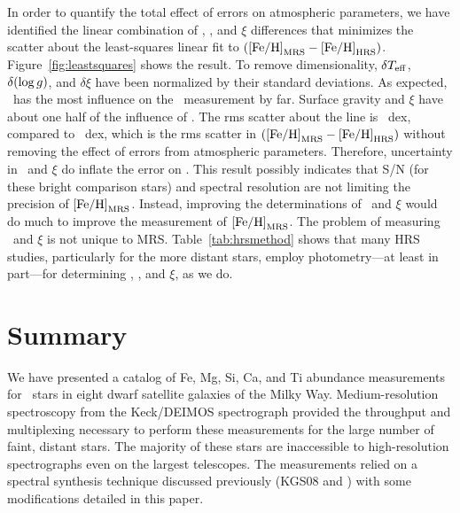 \documentclass{emulateapj}
\begin{document}
In order to quantify the total effect of errors on atmospheric
parameters, we have identified the linear combination of \teff, \logg,
and $\xi$ differences that minimizes the scatter about the
least-squares linear fit to $({\rm [Fe/H]}_{\rm MRS} - {\rm [Fe/H]}_{\rm
  HRS})$.  Figure~\ref{fig:leastsquares} shows the result.  To remove
dimensionality, $\delta T_{\rm eff}$, $\delta(\log g)$, and
$\delta\xi$ have been normalized by their standard deviations.  As
expected, \teff\ has the most influence on the \feh\ measurement by
far.  Surface gravity and $\xi$ have about one half of the influence
of \teff.  The rms scatter about the line is \fehscatter~dex, compared
to \allfehdiffsigma~dex, which is the rms scatter in $({\rm [Fe/H]}_{\rm
  MRS} - {\rm [Fe/H]}_{\rm HRS})$ without removing the effect of errors
from atmospheric parameters.  Therefore, uncertainty in \teff\ and
$\xi$ do inflate the error on \feh.  This result possibly indicates
that S/N (for these bright comparison stars) and spectral resolution
are not limiting the precision of ${\rm [Fe/H]}_{\rm MRS}$.  Instead,
improving the determinations of \teff\ and $\xi$ would do much to
improve the measurement of ${\rm [Fe/H]}_{\rm MRS}$.  The problem of
measuring \teff\ and $\xi$ is not unique to MRS.
Table~\ref{tab:hrsmethod} shows that many HRS studies, particularly
for the more distant stars, employ photometry---at least in part---for
determining \teff, \logg, and $\xi$, as we do.




\section{Summary}
\label{sec:summary}

We have presented a catalog of Fe, Mg, Si, Ca, and Ti abundance
measurements for \ndsphstars\ stars in eight dwarf satellite galaxies
of the Milky Way.  Medium-resolution spectroscopy from the Keck/DEIMOS
spectrograph provided the throughput and multiplexing necessary to
perform these measurements for the large number of faint, distant
stars.  The majority of these stars are inaccessible to
high-resolution spectrographs even on the largest telescopes.  The
measurements relied on a spectral synthesis technique discussed
previously (KGS08 and \citeauthor*{kir09}) with some modifications
detailed in this paper.
\end{document}
